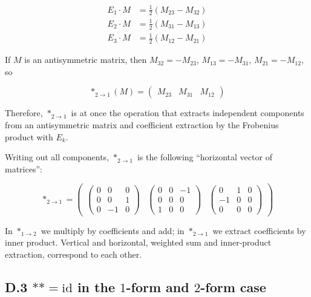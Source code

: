 \documentclass[a4paper,12pt,openany]{book}
\begin{document}
\[
\begin{aligned}
E_1 \cdot M &= \frac{1}{2}(M_{23}-M_{32}) \\
E_2 \cdot M &= \frac{1}{2}(M_{31}-M_{13}) \\
E_3 \cdot M &= \frac{1}{2}(M_{12}-M_{21})
\end{aligned}
\]

If \(M\) is an antisymmetric matrix, then \(M_{32}=-M_{23}\),
\(M_{13}=-M_{31}\), \(M_{21}=-M_{12}\), so

\[
\ast_{2\to1}(M)
=
\begin{pmatrix}
M_{23} & M_{31} & M_{12}
\end{pmatrix}
\]

Therefore, \(\ast_{2\to1}\) is at once the operation that extracts
independent components from an antisymmetric matrix and coefficient
extraction by the Frobenius product with \(E_k\).

Writing out all components, \(\ast_{2\to1}\) is the following
``horizontal vector of matrices'':

\[
\ast_{2\to1} = \begin{pmatrix}
\begin{pmatrix} 0 & 0 & 0 \\ 0 & 0 & 1 \\ 0 & -1 & 0 \end{pmatrix} &
\begin{pmatrix} 0 & 0 & -1 \\ 0 & 0 & 0 \\ 1 & 0 & 0 \end{pmatrix} &
\begin{pmatrix} 0 & 1 & 0 \\ -1 & 0 & 0 \\ 0 & 0 & 0 \end{pmatrix}
\end{pmatrix}
\]

In \(\ast_{1\to2}\) we multiply by coefficients and add; in
\(\ast_{2\to1}\) we extract coefficients by inner product. Vertical and
horizontal, weighted sum and inner-product extraction, correspond to
each other.

\hypertarget{d.3-astastmathrmid-in-the-1-form-and-2-form-case}{%
\subsection*{\texorpdfstring{D.3 \(\ast\ast=\mathrm{id}\) in the
\(1\)-form and \(2\)-form
case}{D.3 \textbackslash ast\textbackslash ast=\textbackslash mathrm\{id\} in the 1-form and 2-form case}}\label{d.3-astastmathrmid-in-the-1-form-and-2-form-case}}
\end{document}
